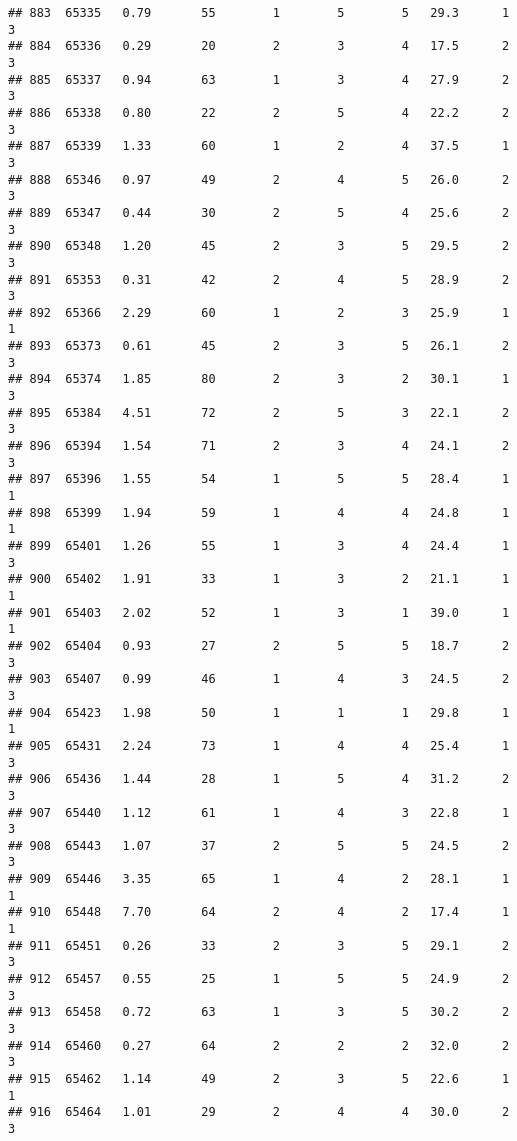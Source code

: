 \documentclass[
]{article}
\begin{document}
\begin{verbatim}
## 883  65335   0.79       55        1        5        5   29.3      1      3
## 884  65336   0.29       20        2        3        4   17.5      2      3
## 885  65337   0.94       63        1        3        4   27.9      2      3
## 886  65338   0.80       22        2        5        4   22.2      2      3
## 887  65339   1.33       60        1        2        4   37.5      1      3
## 888  65346   0.97       49        2        4        5   26.0      2      3
## 889  65347   0.44       30        2        5        4   25.6      2      3
## 890  65348   1.20       45        2        3        5   29.5      2      3
## 891  65353   0.31       42        2        4        5   28.9      2      3
## 892  65366   2.29       60        1        2        3   25.9      1      1
## 893  65373   0.61       45        2        3        5   26.1      2      3
## 894  65374   1.85       80        2        3        2   30.1      1      3
## 895  65384   4.51       72        2        5        3   22.1      2      3
## 896  65394   1.54       71        2        3        4   24.1      2      3
## 897  65396   1.55       54        1        5        5   28.4      1      1
## 898  65399   1.94       59        1        4        4   24.8      1      1
## 899  65401   1.26       55        1        3        4   24.4      1      3
## 900  65402   1.91       33        1        3        2   21.1      1      1
## 901  65403   2.02       52        1        3        1   39.0      1      1
## 902  65404   0.93       27        2        5        5   18.7      2      3
## 903  65407   0.99       46        1        4        3   24.5      2      3
## 904  65423   1.98       50        1        1        1   29.8      1      1
## 905  65431   2.24       73        1        4        4   25.4      1      3
## 906  65436   1.44       28        1        5        4   31.2      2      3
## 907  65440   1.12       61        1        4        3   22.8      1      3
## 908  65443   1.07       37        2        5        5   24.5      2      3
## 909  65446   3.35       65        1        4        2   28.1      1      1
## 910  65448   7.70       64        2        4        2   17.4      1      1
## 911  65451   0.26       33        2        3        5   29.1      2      3
## 912  65457   0.55       25        1        5        5   24.9      2      3
## 913  65458   0.72       63        1        3        5   30.2      2      3
## 914  65460   0.27       64        2        2        2   32.0      2      3
## 915  65462   1.14       49        2        3        5   22.6      1      1
## 916  65464   1.01       29        2        4        4   30.0      2      3

\end{verbatim}
\end{document}
